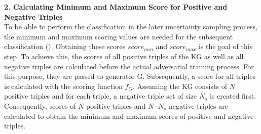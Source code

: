 \textbf{2. Calculating Minimum and Maximum Score for Positive and Negative Triples}\\
To be able to perform the classification in the later uncertainty sampling process, the minimum and maximum scoring values are needed for the subsequent classification ().
Obtaining these scores $score_{min}$ and $score_{max}$ is the goal of this step.
To achieve this, the scores of all positive triples of the \ac{KG} as well as all negative triples are calculated before the actual adversarial training process.
For this purpose, they are passed to generator G.
Subsequently, a score for all triples is calculated with the scoring function $f_G$.
Assuming the \ac{KG} consists of $N$ positive triples and for each triple, a negative triple set of size $N_s$ is created first. 
Consequently, scores of $N$ positive triples and $N \cdot N_s$ negative triples are calculated to obtain the minimum and maximum scores of positive and negative triples.

